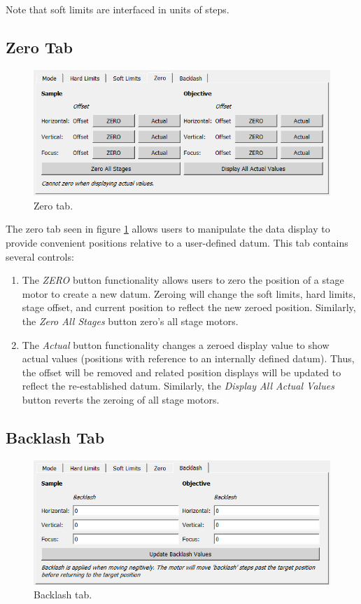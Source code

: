 \documentclass[a4paper, 12pt]{report}
\begin{document}
    Note that soft limits are interfaced in units of steps.

    
    \subsection{Zero Tab}
    \begin{figure}[h]
        \centering
        \includegraphics{figures/zero_tab.png}
        \caption{Zero tab.}
        \label{fig:8}
    \end{figure}

    The zero tab seen in figure \ref{fig:8} allows users to manipulate the data display to provide convenient positions relative to a user-defined datum. This tab contains several controls:
    
    \begin{enumerate}
        \item The \textit{ZERO} button functionality allows users to zero the position of a stage motor to create a new datum. Zeroing will change the soft limits, hard limits, stage offset, and current position to reflect the new zeroed position. Similarly, the \textit{Zero All Stages} button zero's all stage motors.
        \item The \textit{Actual} button functionality changes a zeroed display value to show actual values (positions with reference to an internally defined datum). Thus, the offset will be removed and related position displays will be updated to reflect the re-established datum. Similarly, the \textit{Display All Actual Values} button reverts the zeroing of all stage motors.
    \end{enumerate}
    
    \subsection{Backlash Tab}
    \begin{figure}[h]
        \centering
        \includegraphics{figures/backlash_tab.png}
        \caption{Backlash tab.}
        \label{fig:11}
    \end{figure}
\end{document}
